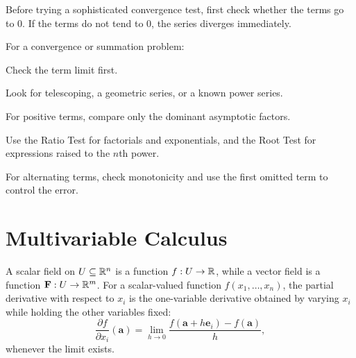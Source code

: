     \begin{strategy}
        Before trying a sophisticated convergence test, first check whether the
        terms go to $0$. If the terms do not tend to $0$, the series diverges
        immediately.
    \end{strategy}

    \begin{algorithm}
        For a convergence or summation problem:
        \begin{bookitems}
            \item Check the term limit first.
            \item Look for telescoping, a geometric series, or a known power
                  series.
            \item For positive terms, compare only the dominant asymptotic
                  factors.
            \item Use the Ratio Test for factorials and exponentials, and the
                  Root Test for expressions raised to the $n$th power.
            \item For alternating terms, check monotonicity and use the first
                  omitted term to control the error.
        \end{bookitems}
    \end{algorithm}

    \section*{Multivariable Calculus}

    \begin{definition}
        A scalar field on $U\subseteq\mathbb{R}^n$ is a function $f:U\to\mathbb{R}$, while a
        vector field is a function $\mathbf{F}:U\to\mathbb{R}^m$. For a scalar-valued
        function $f(x_1,\dots,x_n)$, the partial derivative with respect to
        $x_i$ is the one-variable derivative obtained by varying $x_i$ while
        holding the other variables fixed:
        \[
            \frac{\partial f}{\partial x_i}(\mathbf{a})
            =
            \lim\limits_{h\to0}
            \frac{f(\mathbf{a}+h\mathbf{e}_i)-f(\mathbf{a})}{h},
        \]
        whenever the limit exists.
    \end{definition}

